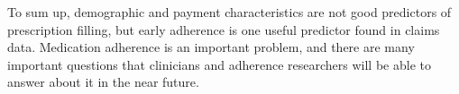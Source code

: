 \documentclass[12pt]{report}
\begin{document}
\begin{large}
To sum up, demographic and payment characteristics are not good
predictors of prescription filling, but early adherence is one useful
predictor found in claims data. Medication adherence is an important
problem, and there are many important questions that clinicians and
adherence researchers will be able to answer about it in the near
future.


\end{large}
\end{document}
